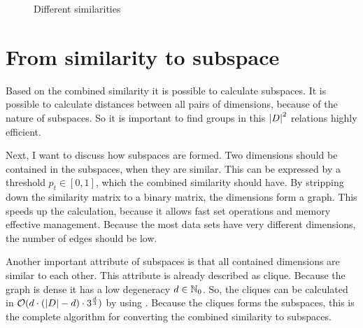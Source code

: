 \begin{figure}
	
	\caption{Different similarities}
	\label{fig:similarities}
\end{figure}

\section{From similarity to subspace}
Based on the combined similarity it is possible to calculate subspaces. It is possible to calculate distances between all pairs of dimensions, because of the nature of subspaces. So it is important to find groups in this $\left|D\right|^2$ relations highly efficient.

Next, I want to discuss how subspaces are formed. Two dimensions should be contained in the subspaces, when they are similar. This can be expressed by a threshold $p_t \in [0,1]$, which the combined similarity should have. By stripping down the similarity matrix to a binary matrix, the dimensions form a graph. This speeds up the calculation, because it allows fast set operations and memory effective management. Because the most data sets have very different dimensions, the number of edges should be low.

Another important attribute of subspaces is that all contained dimensions are similar to each other. This attribute is already described as clique. Because the graph is dense it has a low degeneracy $d \in \mathbb{N}_0$. So, the cliques can be calculated in $\mathcal{O}(d \cdot (\left|D\right| - d) \cdot 3^{\frac{d}{3}})$ by using \cite{listingCliques}. Because the cliques forms the subspaces, this is the complete algorithm for converting the combined similarity to subspaces.

